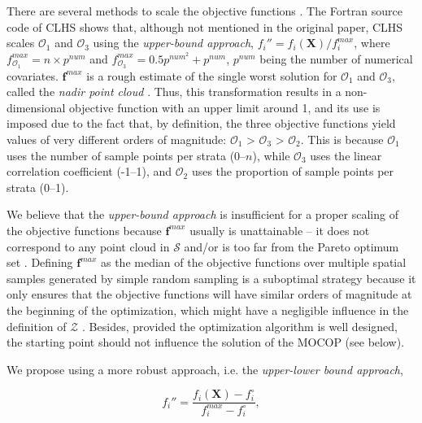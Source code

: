 There are several methods to scale the objective functions \cite{MarlerEtAl2005}. The Fortran source code of 
CLHS shows that, although not mentioned in the original paper, CLHS scales $\mathcal{O}_1$ and $\mathcal{O}_3$ 
using the \emph{upper-bound approach}, $f_i'' =f_i(\boldsymbol{X}) / f_i^{max}$, where $f^{max}_{\mathcal{O}_1} 
= n \times p^{num}$ and $f^{max}_{\mathcal{O}_3} = 0.5p^{num^2} + p^{num}$, $p^{num}$ being the number of 
numerical covariates. $\boldsymbol{f}^{max}$ is a rough estimate of the single worst solution for 
$\mathcal{O}_1$ and $\mathcal{O}_3$, called the \emph{nadir point cloud} \cite{MarlerEtAl2004}. Thus, this 
transformation results in a non-dimensional objective function with an upper limit around 1, and its use is 
imposed due to the fact that, by definition, the three objective functions yield values of very different 
orders of magnitude: $\mathcal{O}_1$ > $\mathcal{O}_3$ > $\mathcal{O}_2$. This is because $\mathcal{O}_1$ uses 
the number of sample points per strata (0--$n$), while $\mathcal{O}_3$ uses the linear correlation coefficient 
(-1--1), and $\mathcal{O}_2$ uses the proportion of sample points per strata (0--1).

We believe that the \emph{upper-bound approach} is insufficient for a proper scaling of the objective functions 
because $\boldsymbol{f}^{max}$ usually is unattainable -- it does not correspond to any point cloud in 
$\mathcal{S}$ and/or is too far from the Pareto optimum set \cite{MarlerEtAl2004}. Defining 
$\boldsymbol{f}^{max}$ as the median of the objective functions over multiple spatial samples generated by 
simple random sampling \cite{CliffordEtAl2014} is a suboptimal strategy because it only ensures that the 
objective functions will have similar orders of magnitude at the beginning of the optimization, which might 
have a negligible influence in the definition of $\mathcal{Z}$ \cite{MarlerEtAl2005}. Besides, provided the 
optimization algorithm is well designed, the starting point should not influence the solution of the MOCOP (see 
below).

We propose using a more robust approach, i.e. the \emph{upper-lower bound approach},

\begin{equation}\label{eqn:chap08-pareto-min-max} %
 f_i'' = \frac{f_i(\boldsymbol{X}) - f_i^{\circ}}{f_i^{max} - f_i^{\circ}},
\end{equation}\label{eqn:chap08-pareto-min-max}

